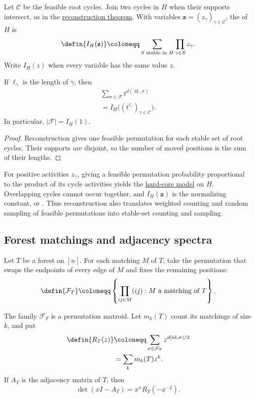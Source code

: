 Let $\mathcal C$ be the feasible root cycles. Join two cycles in $H$
when their supports intersect, as in the
\href{permutations.htm#rootCycles}{reconstruction theorem}.
With variables $\mathbf z=(z_\gamma)_{\gamma\in\mathcal C}$, the
 of $H$ is
\[
 \defin{I_H(\mathbf z)}\coloneqq
 \sum_{S\text{ stable in }H}\prod_{\gamma\in S}z_\gamma.
\]
Write $I_H(z)$ when every variable has the same value $z$.

\begin{proposition}
If $\ell_\gamma$ is the length of $\gamma$, then
\[
 \begin{gathered}
 \sum_{\sigma\in\mathcal F}t^{d(\operatorname{id},\sigma)}\\
 =I_H\bigl((t^{\ell_\gamma})_{\gamma\in\mathcal C}\bigr).
 \end{gathered}
\]
In particular, $|\mathcal F|=I_H(1)$.
\end{proposition}

\begin{proof}
Reconstruction gives one feasible permutation for each stable set of
root cycles. Their supports are disjoint, so the number of moved
positions is the sum of their lengths.
\end{proof}

For positive activities $z_\gamma$, giving a feasible permutation
probability proportional to the product of its cycle activities yields
the \href{https://arxiv.org/abs/1105.5131}{hard-core model} on $H$.
Overlapping cycles cannot occur together, and $I_H(\mathbf z)$ is the
normalizing constant, or .
Thus reconstruction also translates weighted counting and random sampling
of feasible permutations into stable-set counting and sampling.

\subsection[forestMatchings]{Forest matchings and adjacency spectra}

Let $T$ be a forest on $[n]$. For each matching $M$ of $T$, take the
permutation that swaps the endpoints of every edge of $M$ and fixes
the remaining positions:
\[
 \defin{\mathcal F_T}\coloneqq
 \left\{\prod_{ij\in M}(ij):M\text{ a matching of }T\right\}.
\]

\begin{proposition}
The family $\mathcal F_T$ is a permutation matroid. Let $m_k(T)$
count its matchings of size $k$, and put
\[
 \begin{aligned}
 \defin{R_T(z)}
 &\coloneqq\sum_{\sigma\in\mathcal F_T}
 z^{d(\operatorname{id},\sigma)/2}\\
 &=\sum_k m_k(T)z^k.
 \end{aligned}
\]
If $A_T$ is the adjacency matrix of $T$, then
\[
 \det(xI-A_T)=x^nR_T(-x^{-2}).
\]
\end{proposition}

